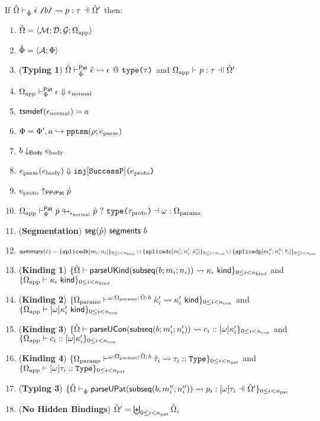 \begin{theorem}
\label{thm:pptsm-abstract-reasoning-principles}
If $\patExpandsP{\uOmega'}{\uPhi}{\utsmap{\uepsilon}{b}}{p}{\tau}$ then:
\begin{enumerate}
  \item ${\hat\Omega}=\langle \mathcal{M}; \mathcal{D}; \mathcal{G}; \Omega_\text{app} \rangle$
  \item $\hat\Phi=\langle \mathcal{A}; \Phi \rangle$
  \item (\textbf{Typing 1}) ${\hat\Omega} \vdash_{\hat\Phi}^{\mathsf{Pat}} {\hat\epsilon} \leadsto \epsilon~@~\texttt{type}\texttt{(}\tau\texttt{)}$ and $\patTypePC{\Omega_\text{app}}{\uOmega'}{p}{\tau}$
  \item $\Omega_\text{app} \vdash_{\Phi}^\mathsf{Pat} \epsilon \Downarrow \epsilon_\text{normal}$
  \item $\mathsf{tsmdef}(\epsilon_\text{normal})=a$
  \item $\Phi = \Phi', a \hookrightarrow \texttt{pptsm}(\rho; e_\text{parse})$
  \item $b \downarrow_\mathsf{Body} e_\text{body}$
  \item $e_\text{parse}(e_\text{body}) \Downarrow \texttt{inj}[\mathtt{SuccessP}]\texttt{(}e_\text{proto}\texttt{)}$
  \item $e_\text{proto} \uparrow_\mathsf{PPrPat} \dot{p}$
  \item $\Omega_\text{app} \vdash_{\Phi}^\mathsf{Pat} \dot{p} \looparrowright_{\epsilon_\text{normal}} \grave{p} ~?~ \texttt{type}\texttt{(}\tau_\text{proto}\texttt{)} \dashv \omega : \Omega_\text{params}$
  \item (\textbf{Segmentation}) $\mathsf{seg}(\grave{p})~\mathsf{segments}~b$
  \item $
  \mathsf{summary}(\grave{e}) = \{\texttt{splicedk}[m_i; n_i]\}_{0 \leq i < n_\text{kind}} \cup \{\texttt{splicedc}[m'_i; n'_i; {\grave\kappa}'_i]\}_{0 \leq i < n_\text{con}} \cup\\
             \{\texttt{splicedp}[m''_i; n''_i; \grave{\tau}_i]\}_{0 \leq i < n_\text{pat}}
  $
  \item (\textbf{Kinding 1}) $\{{\hat\Omega} \vdash \mathsf{parseUKind}(\mathsf{subseq}(b; m_i; n_i)) \leadsto \kappa_i~\mathsf{kind}\}_{0 \leq i < n_\text{kind}}$ and $\{\Omega_\text{app} \vdash \kappa_i~\mathsf{kind}\}_{0 \leq i < n_\text{kind}}$
  \item (\textbf{Kinding 2}) $\{\Omega_\text{params} \vdash^{\omega : \Omega_\text{params};\,{\hat\Omega};\,b} {\grave\kappa}'_i \leadsto \kappa'_i~\mathsf{kind}\}_{0 \leq i < n_\text{con}}$ and $\{\Omega_\text{app} \vdash [\omega]\kappa'_i~\mathsf{kind}\}_{0 \leq i < n_\text{con}}$
  \item (\textbf{Kinding 3}) $\{{\hat\Omega} \vdash \mathsf{parseUCon}(\mathsf{subseq}(b; m'_i; n'_i)) \leadsto c_i :: [\omega]\kappa'_i\}_{0 \leq i < n_\text{con}}$ and $\{\Omega_\text{app} \vdash c_i :: [\omega]\kappa'_i\}_{0 \leq i < n_\text{con}}$
  \item (\textbf{Kinding 4}) $\{\Omega_\text{params} \vdash^{\omega : \Omega_\text{params};\,{\hat\Omega};\,b} \grave{\tau}_i \leadsto \tau_i :: \texttt{Type}\}_{0 \leq i < n_\text{pat}}$ and $\{\Omega_\text{app} \vdash [\omega]\tau_i :: \texttt{Type}\}_{0 \leq i < n_\text{pat}}$
  \item (\textbf{Typing 3}) $\sseq{\patExpandsP{\uOmega'}{\uPhi}{\parseUPatF{\bsubseq{b}{m''_i}{n''_i}}}{p_i}{[\omega]\tau_i}}{\npat}$
      \item (\textbf{No Hidden Bindings}) ${\hat\Omega}' = \biguplus_{0 \leq i < n_\text{pat}} {\hat\Omega} _i$


\end{enumerate}
\end{theorem}
